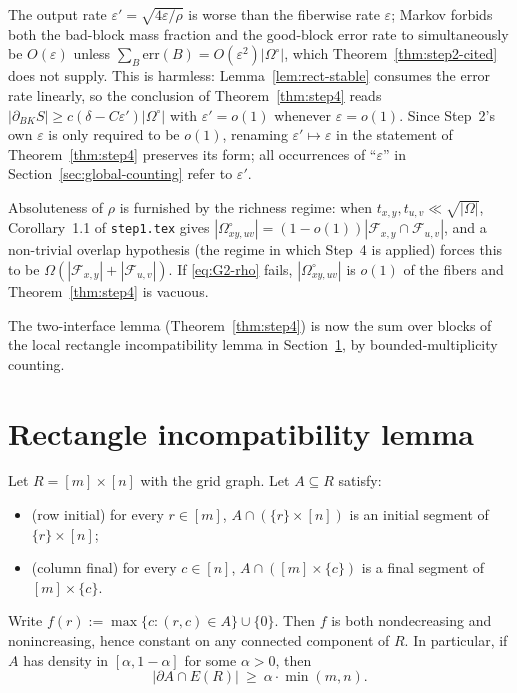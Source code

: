\begin{remark}
\label{rem:G2-rename}
The output rate $\varepsilon'=\sqrt{4\varepsilon/\rho}$ is worse than
the fiberwise rate $\varepsilon$; Markov forbids both the bad-block
mass fraction and the good-block error rate to simultaneously be
$O(\varepsilon)$ unless $\sum_B\mathrm{err}(B)=O(\varepsilon^2)|\Omega^\circ|$,
which Theorem~\ref{thm:step2-cited} does not supply. This is harmless:
Lemma~\ref{lem:rect-stable} consumes the error rate linearly, so
the conclusion of Theorem~\ref{thm:step4} reads
$|\partial_{BK}S|\ge c(\delta-C\varepsilon')|\Omega^\circ|$ with
$\varepsilon'=o(1)$ whenever $\varepsilon=o(1)$. Since Step~2's own
$\varepsilon$ is only required to be $o(1)$, renaming
$\varepsilon'\mapsto\varepsilon$ in the statement of
Theorem~\ref{thm:step4} preserves its form; all occurrences of
``$\varepsilon$'' in Section~\ref{sec:global-counting} refer to
$\varepsilon'$.
\end{remark}

\begin{remark}
Absoluteness of $\rho$ is furnished by the richness regime: when
$t_{x,y},t_{u,v}\ll\sqrt{|\Omega|}$, Corollary~1.1 of
\texttt{step1.tex} gives
$|\Omega^\circ_{xy,uv}|=(1-o(1))|\mathcal F_{x,y}\cap\mathcal F_{u,v}|$,
and a non-trivial overlap hypothesis (the regime in which Step~4 is
applied) forces this to be $\Omega(|\mathcal F_{x,y}|+|\mathcal F_{u,v}|)$.
If \eqref{eq:G2-rho} fails, $|\Omega^\circ_{xy,uv}|$ is $o(1)$ of the
fibers and Theorem~\ref{thm:step4} is vacuous.
\end{remark}

The two-interface lemma (Theorem~\ref{thm:step4}) is now the sum over
blocks of the local rectangle incompatibility lemma in
Section~\ref{sec:rect-lemma}, by bounded-multiplicity counting.

\section{Rectangle incompatibility lemma}
\label{sec:rect-lemma}

\begin{lemma}
\label{lem:rect-exact}
Let $R=[m]\times[n]$ with the grid graph. Let $A\subseteq R$ satisfy:
\begin{itemize}
\item \textup{(row initial)} for every $r\in[m]$, $A\cap(\{r\}\times[n])$
is an initial segment of $\{r\}\times[n]$;
\item \textup{(column final)} for every $c\in[n]$, $A\cap([m]\times\{c\})$
is a final segment of $[m]\times\{c\}$.
\end{itemize}
Write $f(r):=\max\{c:(r,c)\in A\}\cup\{0\}$. Then $f$ is both nondecreasing
and nonincreasing, hence constant on any connected component of $R$. In
particular, if $A$ has density in $[\alpha,1-\alpha]$ for some $\alpha>0$,
then
\[
|\partial A\cap E(R)|\ \ge\ \alpha\cdot\min(m,n).
\]
\end{lemma}

